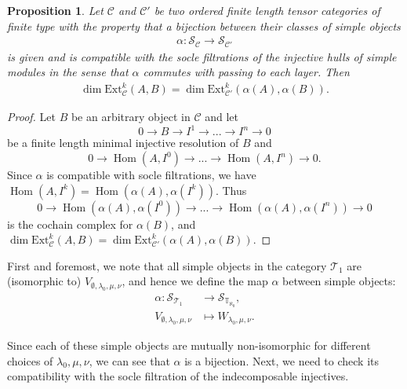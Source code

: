 \documentclass[openany, a4paper]{amsbook}
\newtheorem{prop}[thm]{Proposition}
\theoremstyle{definition}
\numberwithin{equation}{chapter}
\newcommand{\T}[1]{{\mathbb{T}}_{\aleph_{#1}}}
\DeclareMathOperator{\Hom}{\mathrm{Hom}}
\newcommand{\Ext}[4]{\mathrm{Ext}^{#1}_{#2}({#3}, {#4})}
\begin{document}
\begin{prop}\label{ordered category}
    Let $\mathcal{C}$ and $\mathcal{C}'$ be two ordered finite length tensor categories of finite type with the property that a bijection between their classes of simple objects 
    \begin{align}
        \alpha: \mathcal{S}_{\mathcal{C}} \longrightarrow \mathcal{S}_{\mathcal{C}'}
    \end{align}
    is given and is compatible with the socle filtrations of the injective hulls of simple modules in the sense that $\alpha$ commutes with passing to each layer. Then 
    \begin{align}
        \dim \Ext{k}{\mathcal{C}}{A}{B} = \dim \Ext{k}{\mathcal{C}'}{\alpha(A)}{\alpha(B)}.
    \end{align}
\end{prop}
\begin{proof}
    Let $B$ be an arbitrary object in $\mathcal{C}$ and let 
    \begin{equation}
        0 \to B \to I^1 \to ... \to I^n \to 0
    \end{equation}
    be a finite length minimal injective resolution of $B$ and 
    \begin{equation}
        0 \to \Hom (A, I^0) \to ... \to \Hom (A, I^n) \to 0.
    \end{equation}
    Since $\alpha$ is compatible with socle filtrations, we have $\Hom (A, I^k) = \Hom (\alpha(A), \alpha(I^k))$. Thus  
    \begin{equation}
        0 \to \Hom (\alpha(A), \alpha(I^0)) \to ... \to \Hom (\alpha(A), \alpha(I^n)) \to 0
    \end{equation}
    is the cochain complex for $\alpha(B)$, and $\dim \Ext{k}{\mathcal{C}}{A}{B} = \dim \Ext{k}{\mathcal{C}'}{\alpha(A)}{\alpha(B)}$.
\end{proof}

First and foremost, we note that all simple objects in the category $\mathcal{T}_1$ are (isomorphic to) $V_{\emptyset, \lambda_0, \mu, \nu}$, and hence we define the map $\alpha$ between simple objects:
\begin{align*}
    \alpha \colon \mathcal{S}_{\mathcal{T}_1} &\longrightarrow \mathcal{S}_{\T{0}}, \\
    V_{\emptyset, \lambda_0, \mu, \nu} &\longmapsto W_{\lambda_0, \mu, \nu}.
\end{align*}

Since each of these simple objects are mutually non-isomorphic for different choices of $\lambda_0, \mu, \nu$, we can see that $\alpha$ is a bijection. Next, we need to check its compatibility with the socle filtration of the indecomposable injectives.
\end{document}
